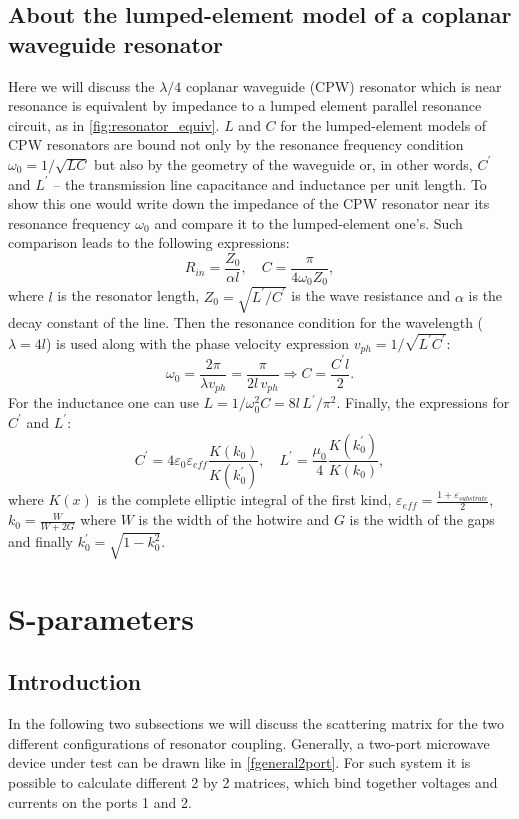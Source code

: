 \documentclass[12pt]{report}
\numberwithin{equation}{section}
\begin{document}
\subsection{About the lumped-element model of a coplanar waveguide resonator}
Here we will discuss the $\lambda/4$ coplanar waveguide (CPW) resonator which is near resonance is equivalent by impedance to a lumped element parallel resonance circuit, as in \autoref{fig:resonator_equiv}. $L$ and $C$ for the lumped-element models of CPW resonators are bound not only by the resonance frequency condition $\omega_0 = 1/\sqrt{LC}$ but also by the geometry of the waveguide or, in other words, $C^\prime$ and $L^\prime$ -- the transmission line capacitance and inductance per unit length. To show this one would write down the impedance of the CPW resonator near its resonance frequency $\omega_0$ and compare it to the lumped-element one's\cite{pozar2012}. Such comparison leads to the following expressions:
\[
R_{in} = \frac{Z_0}{\alpha l}, \quad C = \frac{\pi}{4\omega_0 Z_0},
\]
where $l$ is the resonator length, $Z_0 = \sqrt{L^\prime/C^\prime}$ is the wave resistance and $\alpha$ is the decay constant of the line. Then the resonance condition for the wavelength ($\lambda = 4 l$) is used along with the phase velocity expression $v_{ph} = 1/\sqrt{L^\prime C^\prime}$:
\[
\omega_0 = \frac{2\pi}{\lambda v_{ph}} =  \frac{\pi}{2 l\, v_{ph}} \Rightarrow  C = \frac{C^\prime l}{2}.
\]
For the inductance one can use $L = 1/\omega_0^2 C = 8 l\, L^\prime/\pi^2$. Finally, the expressions for $C^\prime$ and $L^\prime$:
\[
C^\prime = 4\varepsilon_0\varepsilon_{eff} \frac{K(k_0)}{K(k_0^\prime)},\quad
L^\prime = \frac{\mu_0}{4} \frac{K(k_0^\prime)}{K(k_0)},
\]
where $K(x)$ is the complete elliptic integral of the first kind, $\varepsilon_{eff} = \frac{1+\varepsilon_{substrate}}{2}$, $k_0 = \frac{W}{W+2G}$ where $W$ is the width of the hotwire and $G$ is the width of the gaps and finally $k_0^\prime = \sqrt{1-k_0^2}$.

\section{S-parameters}

\subsection{Introduction}

In the following two subsections we will discuss the scattering matrix for the two different configurations of resonator coupling. Generally, a two-port microwave device under test can be drawn like in \autoref{fgeneral2port}. For such system it is possible to calculate different 2 by 2 matrices, which bind together voltages and currents on the ports 1 and 2.
\end{document}
